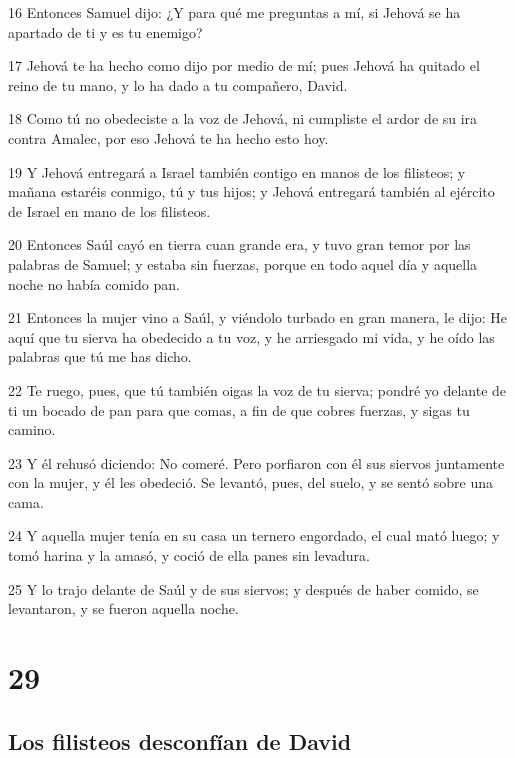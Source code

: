 \par 16 Entonces Samuel dijo: ¿Y para qué me preguntas a mí, si Jehová se ha apartado de ti y es tu enemigo?
\par 17 Jehová te ha hecho como dijo por medio de mí; pues Jehová ha quitado el reino de tu mano, y lo ha dado a tu compañero, David.
\par 18 Como tú no obedeciste a la voz de Jehová, ni cumpliste el ardor de su ira contra Amalec, por eso Jehová te ha hecho esto hoy. 
\par 19 Y Jehová entregará a Israel también contigo en manos de los filisteos; y mañana estaréis conmigo, tú y tus hijos; y Jehová entregará también al ejército de Israel en mano de los filisteos.
\par 20 Entonces Saúl cayó en tierra cuan grande era, y tuvo gran temor por las palabras de Samuel; y estaba sin fuerzas, porque en todo aquel día y aquella noche no había comido pan.
\par 21 Entonces la mujer vino a Saúl, y viéndolo turbado en gran manera, le dijo: He aquí que tu sierva ha obedecido a tu voz, y he arriesgado mi vida, y he oído las palabras que tú me has dicho.
\par 22 Te ruego, pues, que tú también oigas la voz de tu sierva; pondré yo delante de ti un bocado de pan para que comas, a fin de que cobres fuerzas, y sigas tu camino.
\par 23 Y él rehusó diciendo: No comeré. Pero porfiaron con él sus siervos juntamente con la mujer, y él les obedeció. Se levantó, pues, del suelo, y se sentó sobre una cama.
\par 24 Y aquella mujer tenía en su casa un ternero engordado, el cual mató luego; y tomó harina y la amasó, y coció de ella panes sin levadura. 
\par 25 Y lo trajo delante de Saúl y de sus siervos; y después de haber comido, se levantaron, y se fueron aquella noche.

\chapter{29}

\section*{Los filisteos desconfían de David}

